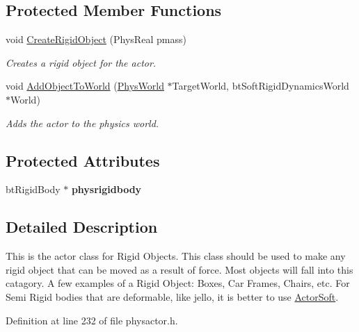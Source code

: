 \subsection*{Protected Member Functions}
\begin{DoxyCompactItemize}
\item 
void \hyperlink{classActorRigid_ac651eed187c3cb912bc7f294f0b42ad1}{CreateRigidObject} (PhysReal pmass)
\begin{DoxyCompactList}\small\item\em Creates a rigid object for the actor. \item\end{DoxyCompactList}\item 
void \hyperlink{classActorRigid_ac6d7e05944623329f0c2140c19e2c49e}{AddObjectToWorld} (\hyperlink{classPhysWorld}{PhysWorld} $\ast$TargetWorld, btSoftRigidDynamicsWorld $\ast$World)
\begin{DoxyCompactList}\small\item\em Adds the actor to the physics world. \item\end{DoxyCompactList}\end{DoxyCompactItemize}
\subsection*{Protected Attributes}
\begin{DoxyCompactItemize}
\item 
\hypertarget{classActorRigid_a6942757e081b5261dbf266f197dc56ab}{
btRigidBody $\ast$ {\bfseries physrigidbody}}
\label{d5/d10/classActorRigid_a6942757e081b5261dbf266f197dc56ab}

\end{DoxyCompactItemize}


\subsection{Detailed Description}
This is the actor class for Rigid Objects. This class should be used to make any rigid object that can be moved as a result of force. Most objects will fall into this catagory. A few examples of a Rigid Object: Boxes, Car Frames, Chairs, etc. For Semi Rigid bodies that are deformable, like jello, it is better to use \hyperlink{classActorSoft}{ActorSoft}. 

Definition at line 232 of file physactor.h.



